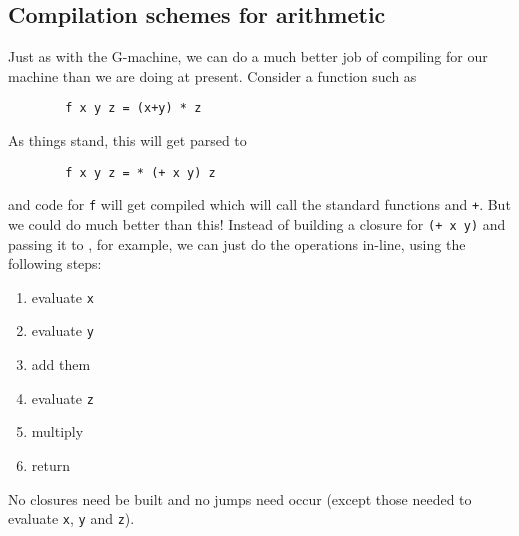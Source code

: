 \subsection{Compilation schemes for arithmetic}
\label{sect:tim:better-arith}

Just as with the G-machine, we can do a much better job of compiling for
our machine than we are doing at present.  Consider a function such as
\begin{verbatim}
        f x y z = (x+y) * z
\end{verbatim}
As things stand, this will get parsed to
\begin{verbatim}
        f x y z = * (+ x y) z
\end{verbatim}
and code for \mbox{\tt f} will get compiled which will call the standard functions
\mbox{\tt *} and \mbox{\tt +}.  But we could do much better than this!  Instead of building
a closure for \mbox{\tt (+\ x\ y)} and passing it to \mbox{\tt *}, for example, we can just do
the operations in-line, using the following steps:
\begin{enumerate}
\item
evaluate \mbox{\tt x}
\item
evaluate \mbox{\tt y}
\item
add them
\item
evaluate \mbox{\tt z}
\item
multiply
\item
return
\end{enumerate}
No closures need be built and no jumps need occur (except those needed to
evaluate \mbox{\tt x}, \mbox{\tt y} and \mbox{\tt z}).


